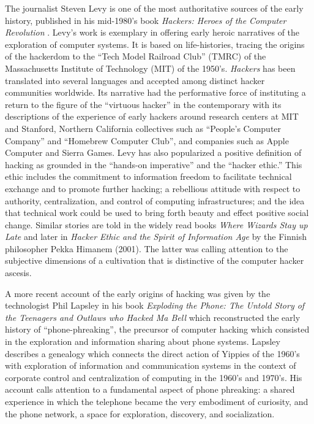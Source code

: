 \documentclass[10pt,letter,oneside]{scrartcl}
\begin{document}
The journalist Steven Levy is one of the most authoritative sources of the early
history, published in his mid-1980's book \emph{Hackers: Heroes of the Computer
  Revolution} \parencite{levy_hackers:_1984}.  Levy's work is exemplary in
offering early heroic narratives of the exploration of computer systems. It is
based on life-histories, tracing the origins of the hackerdom to the ``Tech
Model Railroad Club'' (TMRC) of the Massachusetts Institute of Technology (MIT)
of the 1950's. \emph{Hackers} has been translated into several languages and
accepted among distinct hacker communities worldwide.  Its narrative had the
performative force of instituting a return to the figure of the ``virtuous
hacker'' in the contemporary with its descriptions of the experience of early
hackers around research centers at MIT and Stanford, Northern California
collectives such as ``People's Computer Company'' and ``Homebrew Computer
Club'', and companies such as Apple Computer and Sierra Games.  Levy has also
popularized a positive definition of hacking as grounded in the ``hands-on
imperative'' and the ``hacker ethic.''  This ethic includes the commitment to
information freedom to facilitate technical exchange and to promote further
hacking; a rebellious attitude with respect to authority, centralization, and
control of computing infrastructures; and the idea that technical work could be
used to bring forth beauty and effect positive social change.  Similar stories
are told in the widely read books \emph{Where Wizards Stay up
  Late} \parencite{hafner1998wizards} and later in \emph{Hacker Ethic and the
  Spirit of Information Age} by the Finnish philosopher Pekka Himanem
(2001). The latter was calling attention to the subjective dimensions of a
cultivation that is distinctive of the computer hacker ascesis.

A more recent account of the early origins of hacking was given by the
technologist Phil Lapsley \cite*{lapsley_exploding_2013} in his book
\emph{Exploding the Phone: The Untold Story of the Teenagers and Outlaws who
  Hacked Ma Bell} which reconstructed the early history of ``phone-phreaking'',
the precursor of computer hacking which consisted in the exploration and
information sharing about phone systems.  Lapsley describes a genealogy which
connects the direct action of Yippies of the 1960's with exploration of
information and communication systems in the context of corporate control and
centralization of computing in the 1960's and 1970's.  His account calls
attention to a fundamental aspect of phone phreaking: a shared experience in
which the telephone became the very embodiment of curiosity, and the phone
network, a space for exploration, discovery, and socialization.
\end{document}
